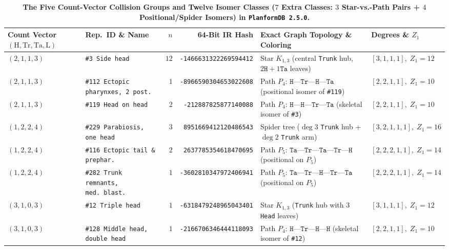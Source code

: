 \documentclass[11pt,a4paper]{article}
\theoremstyle{definition}
\theoremstyle{remark}
\begin{document}
\begin{table}[H]
\centering
\caption{\textbf{The Five Count-Vector Collision Groups and Twelve Isomer Classes ($7$ Extra Classes: $3$ Star-vs.-Path Pairs + $4$ Positional/Spider Isomers) in \texttt{PlanformDB~2.5.0}.}}
\label{tab:isomers}
\footnotesize
\begin{tabular}{@{}llrrll@{}}
\toprule
\textbf{Count Vector $(\text{H},\text{Tr},\text{Ta},\text{L})$} & \textbf{Rep.\ ID \& Name} & \textbf{$n$} & \textbf{64-Bit IR Hash} & \textbf{Exact Graph Topology \& Coloring} & \textbf{Degrees \& $Z_1$} \\
\midrule
$(2, 1, 1, 3)$ & \texttt{\#3 Side head} & $12$ & \texttt{-1466631322269594412} & Star $K_{1,3}$ (central \texttt{Trunk} hub, $2\mathtt{H}+1\mathtt{Ta}$ leaves) & $[3,1,1,1],\; Z_1 = 12$ \\
$(2, 1, 1, 3)$ & \texttt{\#112 Ectopic pharynxes, 2 post.} & $1$ & \texttt{-8966590304653022608} & Path $P_4$: $\mathtt{H}\text{---}\mathtt{Tr}\text{---}\mathtt{H}\text{---}\mathtt{Ta}$ (positional isomer of \texttt{\#119}) & $[2,2,1,1],\; Z_1 = 10$ \\
$(2, 1, 1, 3)$ & \texttt{\#119 Head on head} & $2$ & \texttt{-212887825877140088} & Path $P_4$: $\mathtt{H}\text{---}\mathtt{H}\text{---}\mathtt{Tr}\text{---}\mathtt{Ta}$ (skeletal isomer of \texttt{\#3}) & $[2,2,1,1],\; Z_1 = 10$ \\
\midrule
$(1, 2, 2, 4)$ & \texttt{\#229 Parabiosis, one head} & $3$ & \texttt{8951669412120486543} & Spider tree ($\deg 3$ \texttt{Trunk} hub + $\deg 2$ \texttt{Trunk} arm) & $[3,2,1,1,1],\; Z_1 = 16$ \\
$(1, 2, 2, 4)$ & \texttt{\#116 Ectopic tail \& prephar.} & $2$ & \texttt{2637785354618470695} & Path $P_5$: $\mathtt{Ta}\text{---}\mathtt{Tr}\text{---}\mathtt{Ta}\text{---}\mathtt{Tr}\text{---}\mathtt{H}$ (positional on $P_5$) & $[2,2,2,1,1],\; Z_1 = 14$ \\
$(1, 2, 2, 4)$ & \texttt{\#282 Trunk remnants, med.\ blast.} & $1$ & \texttt{-3602810347972406941} & Path $P_5$: $\mathtt{Ta}\text{---}\mathtt{Tr}\text{---}\mathtt{H}\text{---}\mathtt{Tr}\text{---}\mathtt{Ta}$ (positional on $P_5$) & $[2,2,2,1,1],\; Z_1 = 14$ \\
\midrule
$(3, 1, 0, 3)$ & \texttt{\#12 Triple head} & $1$ & \texttt{-6318479248965043401} & Star $K_{1,3}$ (\texttt{Trunk} hub with $3$ \texttt{Head} leaves) & $[3,1,1,1],\; Z_1 = 12$ \\
$(3, 1, 0, 3)$ & \texttt{\#128 Middle head, double head} & $1$ & \texttt{-2166706346444118093} & Path $P_4$: $\mathtt{H}\text{---}\mathtt{Tr}\text{---}\mathtt{H}\text{---}\mathtt{H}$ (skeletal isomer of \texttt{\#12}) & $[2,2,1,1],\; Z_1 = 10$ \\

\end{tabular}
\end{table}
\end{document}
